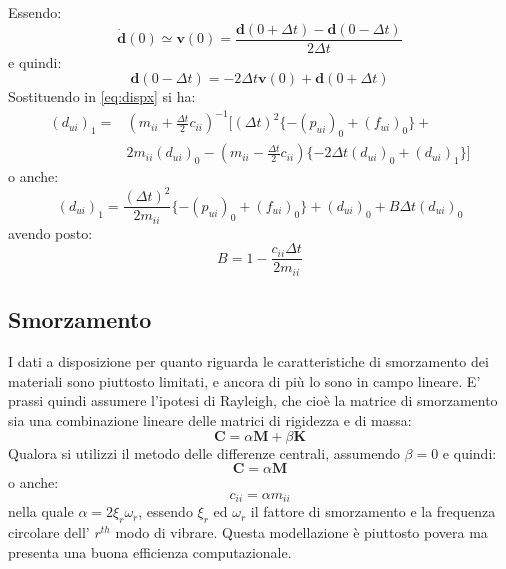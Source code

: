 Essendo:
\begin{equation}
	 \boldsymbol{\dot{d}}(0) \simeq \boldsymbol{v}(0) = \frac{\boldsymbol{d}(0 + \varDelta t) - \boldsymbol{d}(0 - \varDelta t)}{2 \varDelta t}
\end{equation}
e quindi:
\begin{equation}
	\boldsymbol{d}(0 - \varDelta t) = -2\varDelta t \boldsymbol{v}(0) + \boldsymbol{d}(0 + \varDelta t)
\end{equation}
Sostituendo in \ref{eq:dispx} si ha:
\begin{equation} 
	\begin{split}
		(d_{ui})_1 = & (m_{ii} + \frac{\varDelta t}{2} c_{ii})^{-1} [(\varDelta t)^2 \{ - (p_{ui})_0 + (f_{ui})_0 \} + \\ 
		&2 m_{ii} (d_{ui})_0 - (m_{ii} - \frac{\varDelta t}{2} c_{ii}) \{-2 \varDelta t (d_{ui})_0 + (d_{ui})_1 \} ]
	\end{split} 
\end{equation}
o anche:
\begin{equation}
		(d_{ui})_1 = \frac{(\varDelta t)^2}{2 m_{ii}} \{ -(p_{ui})_0 + (f_{ui})_0 \} + (d_{ui})_0 + B\varDelta t (d_{ui})_0
\end{equation}
avendo posto:
\begin{equation*}
	B = 1- \frac{c_{ii}\varDelta t}{2m_{ii}}
\end{equation*}

\subsection{Smorzamento}
I dati a disposizione per quanto riguarda le caratteristiche di smorzamento dei materiali sono piuttosto limitati, e ancora di più lo sono in campo lineare. E' prassi quindi assumere l'ipotesi di Rayleigh, che cioè la matrice di smorzamento sia una combinazione lineare delle matrici di rigidezza e di massa:
\begin{equation}
	\boldsymbol{C} = \alpha \boldsymbol{M} + \beta \boldsymbol{K}
\end{equation}
Qualora si utilizzi il metodo delle differenze centrali, assumendo $\beta = 0$ e quindi:
\begin{equation}
	\boldsymbol{C} = \alpha \boldsymbol{M}
\end{equation}
o anche:
\begin{equation*}
	c_{ii} = \alpha m_{ii}
\end{equation*}
nella quale $\alpha = 2 \xi_{r} \omega_{r} $, essendo $\xi_{r}$ ed $\omega_{r}$ il fattore di smorzamento e la frequenza circolare dell' $r^{th}$ modo di vibrare. Questa modellazione è piuttosto povera ma presenta una buona efficienza computazionale.

